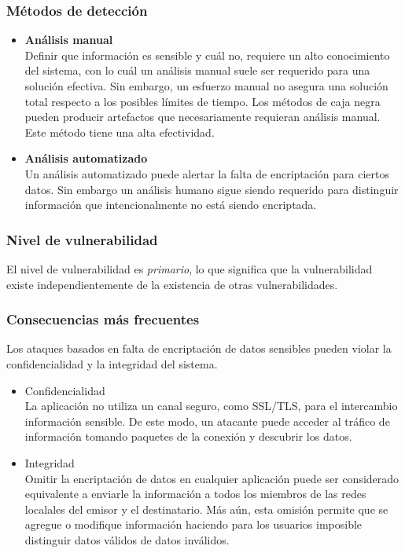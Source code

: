\subsubsection{Métodos de detección}
\begin{itemize}
 \item \textbf{Análisis manual}\\
	Definir que información es sensible y cuál no, requiere un alto conocimiento del sistema, con lo cuál un análisis manual suele ser requerido para una solución efectiva.
	Sin embargo, un esfuerzo manual no asegura una solución total respecto a los posibles límites de tiempo.
	Los métodos de caja negra pueden producir artefactos que necesariamente requieran análisis manual.
	Este método tiene una alta efectividad.
  \item \textbf{Análisis automatizado}\\
  Un análisis automatizado puede alertar la falta de encriptación para ciertos datos.
  Sin embargo un análisis humano sigue siendo requerido para distinguir información que intencionalmente no está siendo encriptada.
\end{itemize}

\subsubsection{Nivel de vulnerabilidad}

El nivel de vulnerabilidad es \textit{primario}, lo que significa que la vulnerabilidad existe independientemente de la existencia de otras vulnerabilidades.

\subsubsection{Consecuencias más frecuentes}

Los ataques basados en falta de encriptación de datos sensibles pueden violar la confidencialidad y la integridad del sistema.

\begin{itemize}
 \item Confidencialidad\\
        La aplicación no utiliza un canal seguro, como SSL/TLS, para  el intercambio información sensible.
	De este modo, un atacante puede acceder al tráfico de información tomando paquetes de la conexión y descubrir los datos.
 \item Integridad\\
        Omitir la encriptación de datos en cualquier aplicación puede ser considerado equivalente a enviarle la información a todos los miembros de las redes localales del
	emisor y el destinatario. Más aún, esta omisión permite que se agregue o modifique información haciendo para los usuarios imposible distinguir datos válidos de datos inválidos.
\end{itemize}

